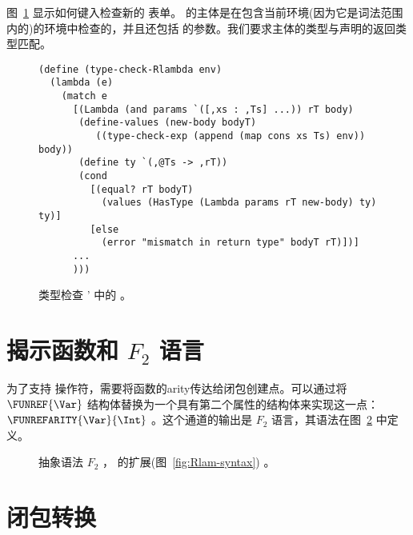 \documentclass[11pt]{book}
\newcommand{\gray}[1]{{\color{gray} #1}}
\begin{document}
\label{sec:type-check-r5}

图~\ref{fig:type-check-Rlambda} 显示如何键入检查新的
 表单。  的主体是在包含当前环境(因为它是词法范围内的)的环境中检查的，并且还包括  的参数。我们要求主体的类型与声明的返回类型匹配。

\begin{figure}[tbp]
\begin{lstlisting}
(define (type-check-Rlambda env)
  (lambda (e)
    (match e
      [(Lambda (and params `([,xs : ,Ts] ...)) rT body)
       (define-values (new-body bodyT) 
          ((type-check-exp (append (map cons xs Ts) env)) body))
       (define ty `(,@Ts -> ,rT))
       (cond
         [(equal? rT bodyT)
           (values (HasType (Lambda params rT new-body) ty) ty)]
         [else
           (error "mismatch in return type" bodyT rT)])]
      ...
      )))
\end{lstlisting}
\caption{类型检查 ' 中的 \LangLam{} 。}
\label{fig:type-check-Rlambda}
\end{figure}


\section{揭示函数和 $F_2$ 语言}
\label{sec:reveal-functions-r5}


为了支持  操作符，需要将函数的arity传达给闭包创建点。可以通过将 $\FUNREF{\Var}$ 结构体替换为一个具有第二个属性的结构体来实现这一点： $\FUNREFARITY{\Var}{\Int}$ 。这个通道的输出是 $F_2$ 语言，其语法在图~\ref{fig:f2-syntax} 中定义。

\begin{figure}[tp]
\centering
\fbox{
\begin{minipage}{0.96\textwidth}
\[
\begin{array}{lcl}
\Exp &::=& \ldots \mid \FUNREFARITY{\Var}{\Int}\\
 \Def &::=& \gray{ \FUNDEF{\Var}{([\Var \code{:} \Type]\ldots)}{\Type}{\code{'()}}{\Exp} }\\
  F_2 &::=& \gray{\PROGRAMDEFS{\code{'()}}{\LP \Def\ldots \RP}}
\end{array}
\]
\end{minipage}
}
\caption{抽象语法 $F_2$ ， \LangLam{} 的扩展(图~\ref{fig:Rlam-syntax}) 。}
\label{fig:f2-syntax}
\end{figure}


\section{闭包转换}
\label{sec:closure-conversion}
\end{document}
